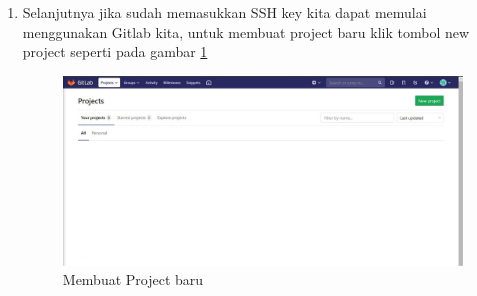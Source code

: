 \begin{enumerate}
\item Selanjutnya jika sudah memasukkan SSH key kita dapat memulai menggunakan Gitlab kita, untuk membuat project baru klik tombol new project seperti pada gambar \ref{newproject}
\begin{figure}[!htbp]
\centerline{\includegraphics[width=.75\textwidth]{Figures/akunGit/gitlab8.jpg}}
\caption{Membuat Project baru}
\label{newproject}
\end{figure}
\end{enumerate}